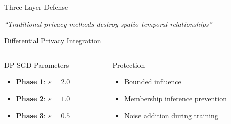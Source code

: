 \documentclass[aspectratio=169,xcolor={dvipsnames}]{beamer}
\begin{document}
\begin{frame}{Three-Layer Defense}
  \begin{center}
  \end{center}
  
  \vspace{1em}
  \begin{alertblock}{}
    \centering
    \textit{``Traditional privacy methods destroy spatio-temporal relationships''}
  \end{alertblock}
\end{frame}

\begin{frame}{Differential Privacy Integration}
  \begin{columns}[T,onlytextwidth]
    \begin{column}{0.48\textwidth}
      \begin{block}{DP-SGD Parameters}
        \begin{itemize}
          \item \textbf{Phase 1}: $\varepsilon = 2.0$
          \item \textbf{Phase 2}: $\varepsilon = 1.0$
          \item \textbf{Phase 3}: $\varepsilon = 0.5$
        \end{itemize}
      \end{block}
    \end{column}
    \hspace{0.04\textwidth}
    \begin{column}{0.48\textwidth}
      \begin{block}{Protection}
        \begin{itemize}
          \item Bounded influence
          \item Membership inference prevention
          \item Noise addition during training
        \end{itemize}
      \end{block}
    \end{column}
  \end{columns}
\end{frame}
\end{document}
